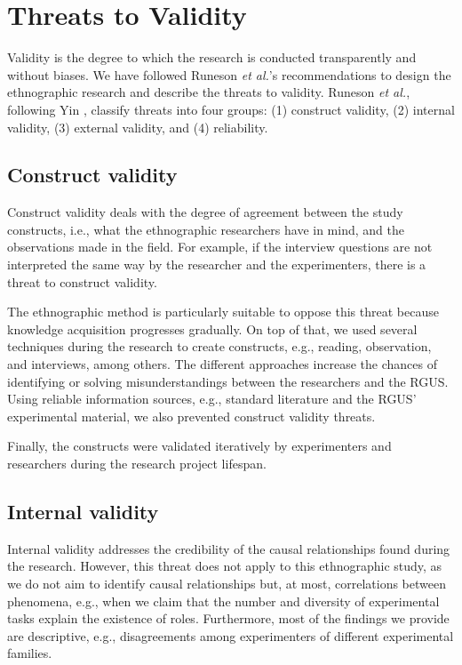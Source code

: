 \section{Threats to Validity}\label{sec-threats}
Validity is the degree to which the research is conducted transparently and without biases. We have followed Runeson \textit{et al.}'s recommendations \cite[pp. 71–73]{Runenson-2012-case-study-SE} to design the ethnographic research and describe the threats to validity. Runeson \textit{et al.}, following Yin \cite{Yin-2009-case-study}, classify threats into four groups: (1) construct validity, (2) internal validity, (3) external validity, and (4) reliability.

\subsection{Construct validity}
Construct validity deals with the degree of agreement between the study constructs, i.e., what the ethnographic researchers have in mind, and the observations made in the field. For example, if the interview questions are not interpreted the same way by the researcher and the experimenters, there is a threat to construct validity. 

The ethnographic method is particularly suitable to oppose this threat because knowledge acquisition progresses gradually. On top of that, we used several techniques during the research to create constructs, e.g., reading, observation, and interviews, among others. The different approaches increase the chances of identifying or solving misunderstandings between the researchers and the RGUS. Using reliable information sources, e.g., standard literature and the RGUS' experimental material, we also prevented construct validity threats. 

Finally, the constructs were validated iteratively by experimenters and researchers during the research project lifespan.

\subsection{Internal validity}
Internal validity addresses the credibility of the causal relationships found during the research. However, this threat does not apply to this ethnographic study, as we do not aim to identify causal relationships but, at most, correlations between phenomena, e.g., when we claim that the number and diversity of experimental tasks explain the existence of roles. Furthermore, most of the findings we provide are descriptive, e.g., disagreements among experimenters of different experimental families.

